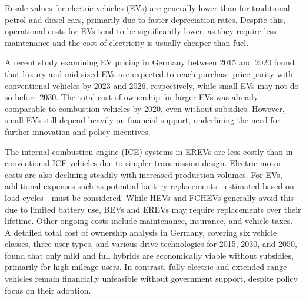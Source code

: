 Resale values for electric vehicles (EVs) are generally lower than for traditional petrol and diesel cars, primarily due to faster depreciation rates. Despite this, operational costs for EVs tend to be significantly lower, as they require less maintenance and the cost of electricity is usually cheaper than fuel.

A recent study examining EV pricing in Germany between 2015 and 2020 found that luxury and mid-sized EVs are expected to reach purchase price parity with conventional vehicles by 2023 and 2026, respectively, while small EVs may not do so before 2030. The total cost of ownership for larger EVs was already comparable to combustion vehicles by 2020, even without subsidies. However, small EVs still depend heavily on financial support, underlining the need for further innovation and policy incentives. \cite{goetzel2022empirical}

The internal combustion engine (ICE) systems in EREVs are less costly than in conventional ICE vehicles due to simpler transmission design. Electric motor costs are also declining steadily with increased production volumes. For EVs, additional expenses such as potential battery replacements—estimated based on load cycles—must be considered. While HEVs and FCHEVs generally avoid this due to limited battery use, BEVs and EREVs may require replacements over their lifetime. Other ongoing costs include maintenance, insurance, and vehicle taxes. A detailed total cost of ownership analysis in Germany, covering six vehicle classes, three user types, and various drive technologies for 2015, 2030, and 2050, found that only mild and full hybrids are economically viable without subsidies, primarily for high-mileage users. In contrast, fully electric and extended-range vehicles remain financially unfeasible without government support, despite policy focus on their adoption. \cite{owid-co2-emissions-from-transport}